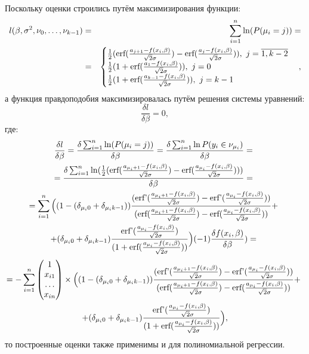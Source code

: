 Поскольку оценки строились путём максимизирования функции:
\begin{eqnarray}
    l(\beta,\sigma^2, \nu_0,\dots, \nu_{k-1})&=&\sum_{i=1}^{n}\ln(P(\mu_i=j))=\\
    &=&\begin{cases}
        \frac{1}{2}(\textup{erf}(\frac{a_{j+1}-f(x_i,\beta)}{\sqrt{2}\sigma})-\textup{erf}(\frac{a_{j}-f(x_i,\beta)}{\sqrt{2}\sigma})),~j=\overline{1,k-2}\\
        \frac{1}{2}(1+\textup{erf}(\frac{a_{1}-f(x_i,\beta)}{\sqrt{2}\sigma})),~j=0\\
        \frac{1}{2}(1+\textup{erf}(\frac{a_{k-1}-f(x_i,\beta)}{\sqrt{2}\sigma})),~j=k-1
    \end{cases},
\end{eqnarray}
а функция правдоподобия максимизировалась путём решения системы уравнений:
\begin{equation}
    \frac{\delta l}{\delta \beta}=0,
\end{equation}
где:
\begin{multline}
    \frac{\delta l}{\delta \beta}=\frac{\delta \sum_{i=1}^{n}\ln(P(\mu_i=j))}{\delta \beta}=\frac{\delta \sum_{i=1}^{n}\ln P(y_i\in \nu_{\mu_i})}{\delta \beta}=~\\
    =\frac{\delta \sum_{i=1}^{n} \ln(\frac{1}{2}(\textup{erf}(\frac{a_{\mu_i+1}-f(x_i,\beta)}{\sqrt{2}\sigma})-\textup{erf}(\frac{a_{\mu_i}-f(x_i,\beta)}{\sqrt{2}\sigma})) )         }{\delta \beta}=~\\
    =  \sum_{i=1}^{n}\Big((1-(\delta_{\mu_i 0}+\delta_{\mu_i k-1}))\frac{(\textup{erf'}(\frac{a_{\mu_i+1}-f(x_i,\beta)}{\sqrt{2}\sigma})-\textup{erf'}(\frac{a_{\mu_i}-f(x_i,\beta)}{\sqrt{2}\sigma}))}{ (\textup{erf}(\frac{a_{\mu_i+1}-f(x_i,\beta)}{\sqrt{2}\sigma})-\textup{erf}(\frac{a_{\mu_i}-f(x_i,\beta)}{\sqrt{2}\sigma}))}+~\\
    +(\delta_{\mu_i 0}+\delta_{\mu_i k-1})\frac{\textup{erf'}(\frac{a_{\mu_i}-f(x_i,\beta)}{\sqrt{2}\sigma})}{(1+\textup{erf}(\frac{a_{\mu_i}-f(x_i,\beta)}{\sqrt{2}\sigma}))}\Big)  (-1) \frac{\delta f(x_i,\beta)}{\delta \beta} )=~
\end{multline}
\begin{multline}
    \nonumber 
    =-\sum_{i=1}^{n}\begin{pmatrix}
        1\\
        x_{i1}\\
        \dots\\
        x_{in}
    \end{pmatrix}\times  \Big((1-(\delta_{\mu_i 0}+\delta_{\mu_i k-1}))\frac{(\textup{erf'}(\frac{a_{\mu_i+1}-f(x_i,\beta)}{\sqrt{2}\sigma})-\textup{erf'}(\frac{a_{\mu_i}-f(x_i,\beta)}{\sqrt{2}\sigma}))}{ (\textup{erf}(\frac{a_{\mu_i+1}-f(x_i,\beta)}{\sqrt{2}\sigma})-\textup{erf}(\frac{a_{\mu_i}-f(x_i,\beta)}{\sqrt{2}\sigma}))}+~\\
    +(\delta_{\mu_i 0}+\delta_{\mu_i k-1})\frac{\textup{erf'}(\frac{a_{\mu_i}-f(x_i,\beta)}{\sqrt{2}\sigma})}{(1+\textup{erf}(\frac{a_{\mu_i}-f(x_i,\beta)}{\sqrt{2}\sigma}))}\Big),
\end{multline}
то построенные оценки также применимы и для полиномиальной регрессии.

